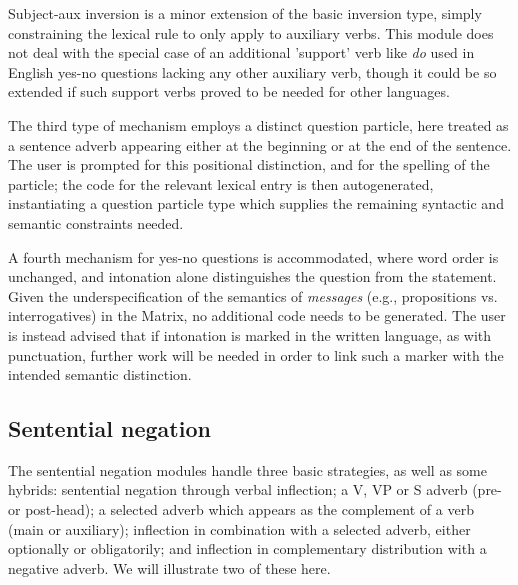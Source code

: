 \documentclass[11pt]{article}
\begin{document}
Subject-aux inversion is a minor extension of the basic inversion type,
simply constraining the lexical rule to only apply to auxiliary verbs.
This module does not deal with the special case of an additional 'support'
verb like {\it do} used in English yes-no questions lacking any other
auxiliary verb, though it could be so extended if such support verbs
proved to be needed for other languages.

The third type of mechanism employs a distinct question particle, here
treated as a sentence adverb appearing either at the beginning or at the
end of the sentence.  The user is prompted for this positional distinction,
and for the spelling of the particle; the code for the relevant lexical
entry is then autogenerated, instantiating a question particle type which
supplies the remaining syntactic and semantic constraints needed.

A fourth mechanism for yes-no questions is accommodated, where word order is
unchanged, and intonation alone distinguishes the question from the statement.
Given the underspecification of the semantics of {\it messages} (e.g.,
propositions vs. interrogatives) in the Matrix, no additional code needs to
be generated.  The user is instead advised that if intonation is marked in 
the written language, as with punctuation, further work will be needed in order
to link such a marker with the intended semantic distinction.

\subsection{Sentential negation}

The sentential negation modules handle three basic strategies, 
as well as some hybrids: sentential negation
through verbal inflection; a V, VP or S adverb (pre- or post-head); a
selected adverb which appears as the complement of a verb (main or
auxiliary); inflection in combination with a selected adverb, either
optionally or obligatorily; and inflection in complementary
distribution with a negative adverb. We will illustrate two of these here.  
\end{document}
